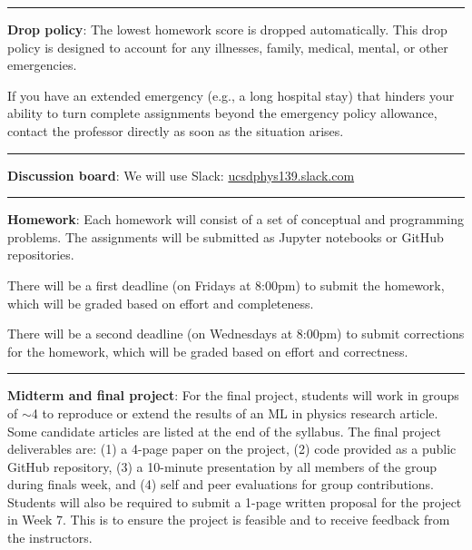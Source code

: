 \documentclass[12pt]{article}
\begin{document}
\begin{center}
	\rule{\textwidth}{0.5pt}
\end{center}

\noindent\textbf{Drop policy}: The lowest homework score is dropped automatically.
This drop policy is designed to account for any illnesses, family, medical, mental, or other emergencies.

If you have an extended emergency (e.g., a long hospital stay) that hinders your ability to turn complete assignments beyond the emergency policy allowance, contact the professor directly as soon as the situation arises.

\begin{center}
	\rule{\textwidth}{0.5pt}
\end{center}

\noindent\textbf{Discussion board}: We will use Slack: \href{https://join.slack.com/t/ucsdphys139/shared\_invite/zt-110gwd4lx-pZBsItfcxhbOD5BV6afVDA}{ucsdphys139.slack.com}

\begin{center}
	\rule{\textwidth}{0.5pt}
\end{center}

\noindent\textbf{Homework}: Each homework will consist of a set of conceptual and programming problems.
The assignments will be submitted as Jupyter notebooks or GitHub repositories.

There will be a first deadline (on Fridays at 8:00pm) to submit the homework, which will be graded based on effort and completeness.

There will be a second deadline (on Wednesdays at 8:00pm) to submit corrections for the homework, which will be graded based on effort and correctness.

\begin{center}
	\rule{\textwidth}{0.5pt}
\end{center}

\noindent\textbf{Midterm and final project}:
For the final project, students will work in groups of $\sim$4 to reproduce or extend the results of an ML in physics research article.
Some candidate articles are listed at the end of the syllabus.
The final project deliverables are: (1) a 4-page paper on the project, (2) code provided as a public GitHub repository, (3) a 10-minute presentation by all members of the group during finals week, and (4) self and peer evaluations for group contributions.
Students will also be required to submit a 1-page written proposal for the project in Week 7.
This is to ensure the project is feasible and to receive feedback from the instructors.
\end{document}

